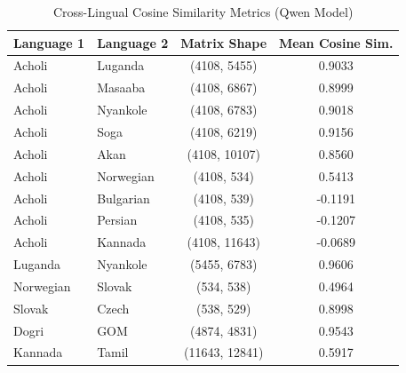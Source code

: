 \documentclass[11pt]{article}
\begin{document}
    \begin{table}
        [htbp]
        \centering
        \small
        \begin{tabular}{llcc}
            \toprule \textbf{Language 1} & \textbf{Language 2} & \textbf{Matrix Shape} & \textbf{Mean Cosine Sim.} \\
            \midrule Acholi              & Luganda             & (4108, 5455)          & 0.9033                    \\
            Acholi                       & Masaaba             & (4108, 6867)          & 0.8999                    \\
            Acholi                       & Nyankole            & (4108, 6783)          & 0.9018                    \\
            Acholi                       & Soga                & (4108, 6219)          & 0.9156                    \\
            Acholi                       & Akan                & (4108, 10107)         & 0.8560                    \\
            Acholi                       & Norwegian           & (4108, 534)           & 0.5413                    \\
            Acholi                       & Bulgarian           & (4108, 539)           & -0.1191                   \\
            Acholi                       & Persian             & (4108, 535)           & -0.1207                   \\
            Acholi                       & Kannada             & (4108, 11643)         & -0.0689                   \\
            Luganda                      & Nyankole            & (5455, 6783)          & 0.9606                    \\
            Norwegian                    & Slovak              & (534, 538)            & 0.4964                    \\
            Slovak                       & Czech               & (538, 529)            & 0.8998                    \\
            Dogri                        & GOM                 & (4874, 4831)          & 0.9543                    \\
            Kannada                      & Tamil               & (11643, 12841)        & 0.5917                    \\
            \bottomrule
        \end{tabular}
        \caption{Cross-Lingual Cosine Similarity Metrics (Qwen Model)}
        \label{tab:qwen_sim}
    \end{table}
\end{document}
